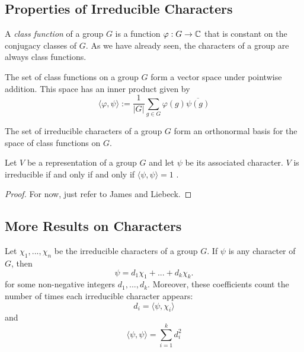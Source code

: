\subsection{Properties of Irreducible Characters}

\begin{definition}
    A \emph{class function} of a group $G$ is a function $\varphi : G \rightarrow \mathbb{C}$ that is constant on the 
    conjugacy classes of $G$. As we have already seen, the characters of a group are always class functions.
    
    The set of class functions on a group $G$ form a vector space under pointwise addition. This space has an inner 
    product given by
    \[
        \langle \varphi, \psi \rangle := \frac{1}{|G|} \sum_{g \in G} \varphi(g)\overline{\psi(g)}
    \]
\end{definition}


\begin{theorem}
    The set of irreducible characters of a group $G$ form an orthonormal basis for the space of class functions on 
    $G$.
\end{theorem}

\begin{theorem}
    Let $V$ be a representation of a group $G$ and let $\psi$ be its associated character.  $V$ is irreducible if 
    and only if and only if $\langle \psi, \psi \rangle = 1$ .
\end{theorem}

\begin{proof}
    For now, just refer to James and Liebeck.
\end{proof}




\subsection{More Results on Characters}

\begin{theorem}
    Let $\chi_1, ..., \chi_n$ be the irreducible characters of a group $G$. If $\psi$ is any character of $G$, then 
    \[
        \psi = d_1\chi_1 + ... + d_k\chi_k.
    \]
    for some non-negative integers $d_1, ..., d_k$. Moreover, these coefficients count the number of times each 
    irreducible character appears:
    \[
        d_i = \langle \psi, \chi_i \rangle
    \]
    and
    \[
        \langle \psi, \psi \rangle = \sum_{i=1}^k d_i^2
    \]
\end{theorem}

